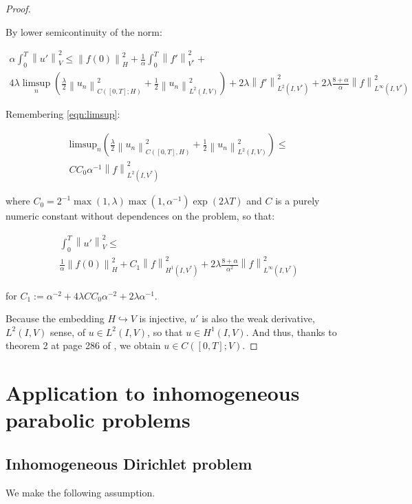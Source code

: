 \documentclass[english,a4paper,12pt,oneside]{scrbook}
\theoremstyle{break}
\newenvironment{mproof}[1][\proofname]{%
  \begin{proof}[#1]$ $\par\nobreak\ignorespaces
}{%
  \end{proof}
}
\renewcommand*{\proofname}{Proof}
\theoremstyle{remark}
\newcommand{\ds}{\displaystyle}
\newcommand{\norm}[1]{\left\lVert#1\right\rVert}
\newcommand{\HN}[1]{\norm{#1}_{H}}
\newcommand{\VN}[1]{\norm{#1}_{V}}
\newcommand{\VSN}[1]{\norm{#1}_{V^*}}
\newcommand{\emb}{\hookrightarrow}
\begin{document}
\begin{mproof}
By lower semicontinuity of the norm:

\begin{align*}
\alpha \int_0^T \VN{u'}^2 \leq \HN{f(0)}^2 +\frac{1}{\alpha} \int_0^T \VSN{ f'}^2+\\
4 \lambda \limsup_n\left (\frac{\lambda}{2} \norm{u_n}^2_{C([0,T];H)} + \frac{1}{2}\norm{u_n}_{L^2(I,V)}^2 \right )+ 2\lambda \norm{f'}_{L^2(I,V^*)}^2  + 2\lambda\frac{8+\alpha}{\alpha}\norm{f}_{L^\infty(I,V^*)}^2
\end{align*}

Remembering \cref{eqn:limsup}:

\begin{align*}
\text{limsup}_n \left ( \frac{\lambda}{2}\norm{u_n}_{C([0,T],H)}^2 + \frac{1}{2}\norm{u_n}_{L^2(I,V)}^2 \right )\leq\\
C C_0 \alpha^{-1}\norm{f}^2_{L^2(I,V^*)}
\end{align*}


where $C_0 = \ds 2^{-1}\max(1,\lambda)\max(1,\alpha^{-1})\exp(2\lambda T)$ and $C$ is a purely numeric constant without dependences on the problem, so that:

\begin{align*}
\int_0^T \VN{u'}^2 \leq \\ \frac{1}{\alpha } \HN{f(0)}^2 + C_1\norm{f}_{H^1(I,V^*)}^2  + 2\lambda\frac{8+\alpha}{\alpha^2}\norm{f}_{L^\infty(I,V^*)}^2
\end{align*}

for $C_1:=\alpha^{-2} + 4 \lambda C C_0 \alpha^{-2} + 2\lambda\alpha ^{-1} $.

Because the embedding $H\emb V$ is injective, $u'$ is also the weak derivative, $L^2(I,V)$ sense, of $u \in L^2(I,V)$, so that $u \in H^1(I,V)$. And thus, thanks to theorem 2 at page 286 of \cite{evans}, we obtain $u \in C([0,T]; V)$.

\end{mproof}


\section{Application to inhomogeneous parabolic problems}

\subsection{Inhomogeneous Dirichlet problem}
\label{subs:inh_diri}

We make the following assumption.
\end{document}
